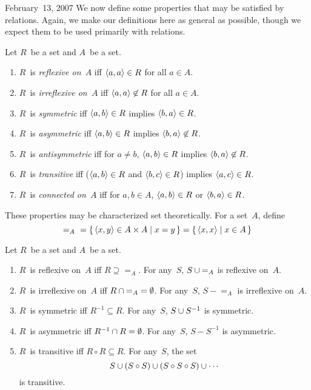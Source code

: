 \begin{lecture}{February~13, 2007}
We now define some properties that may be satisfied by relations. Again, we make our definitions here as general as possible, though we expect them to be used primarily with relations.
\begin{defn}
Let \(R\)~be a set and \(A\)~be a set.
\begin{enumerate}[itemsep=0pt]
\item \(R\)~is \emph{reflexive on~\(A\)} iff \(\langle{a},{a}\rangle\in R\) for all \(a\in A\).
\item \(R\)~is \emph{irreflexive on~\(A\)} iff \(\langle{a},{a}\rangle\not\in R\) for all \(a\in A\).
\item \(R\)~is \emph{symmetric} iff \(\langle{a},{b}\rangle\in R\) implies \(\langle{b},{a}\rangle\in R\).
\item \(R\)~is \emph{asymmetric} iff \(\langle{a},{b}\rangle\in R\) implies \(\langle{b},{a}\rangle\not\in R\).
\item \(R\)~is \emph{antisymmetric} iff for \(a\ne b\), \(\langle{a},{b}\rangle\in R\) implies \(\langle{b},{a}\rangle\not\in R\).
\item \(R\)~is \emph{transitive} iff (\(\langle{a},{b}\rangle\in R\) and \(\langle{b},{c}\rangle\in R\)) implies \(\langle{a},{c}\rangle\in R\).
\item \(R\)~is \emph{connected on~\(A\)} iff for \(a,b\in A\), \(\langle{a},{b}\rangle\in R\) or \(\langle{b},{a}\rangle\in R\).
\end{enumerate}
\end{defn}
\noindent These properties may be characterized set theoretically. For a set~\(A\), define
\[{=}_A\ =\{\,\langle{x},{y}\rangle\in A\times A\mid x=y\,\}=\{\,\langle{x},{x}\rangle\mid x\in A\,\}\]
\begin{thm}
Let \(R\)~be a set and \(A\)~be a set.
\begin{enumerate}[itemsep=0pt]
\item \(R\)~is reflexive on~\(A\) iff \(R\supseteq{=}_A\). For any~\(S\), \(S\cup{=}_A\) is reflexive on~\(A\).
\item \(R\)~is irreflexive on~\(A\) iff \(R\cap{=}_A=\emptyset\). For any~\(S\), \(S-{=}_A\) is irreflexive on~\(A\).
\item \(R\)~is symmetric iff \(R^{-1}\subseteq R\). For any~\(S\), \(S\cup S^{-1}\) is symmetric.
\item \(R\)~is asymmetric iff \(R^{-1}\cap R=\emptyset\). For any~\(S\), \(S-S^{-1}\) is asymmetric.
\item \(R\)~is transitive iff \(R\circ R\subseteq R\). For any~\(S\), the set
\[S\cup(S\circ S)\cup(S\circ S\circ S)\cup\cdots\]
is transitive.
\end{enumerate}
\end{thm}


\end{lecture}
